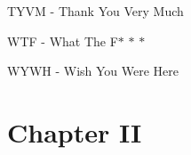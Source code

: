 \documentclass[12pt]{report}
\begin{document}
\begin{adjustwidth}{0.5in}{0.0in}
TYVM - Thank You Very Much\par

\end{adjustwidth}

\begin{adjustwidth}{0.5in}{0.0in}
WTF - What The F$\ast$ $\ast$ $\ast$ \par

\end{adjustwidth}

\begin{adjustwidth}{0.5in}{0.0in}
WYWH - Wish You Were Here\par

\end{adjustwidth}




\newpage

\vspace{\baselineskip}
\vspace{\baselineskip}
\section*{Chapter II}
\end{document}
